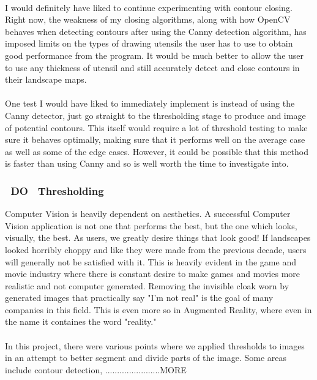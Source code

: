\documentclass[11pt]{article}
\begin{document}
\\
I would definitely have liked to continue experimenting with contour closing.
Right now, the weakness of my closing algorithms, along with how OpenCV
behaves when detecting contours after using the Canny detection algorithm, 
has imposed limits on the types of drawing utensils the user has to use to
obtain good performance from the program. It would be much
better to allow the user to use any thickness of utensil and still 
accurately detect and close contours in their landscape maps.\\
\\
One test I would have liked to immediately implement is instead of using
the Canny detector, just go straight to the thresholding stage to produce
and image of potential contours. This itself would require a lot of
threshold testing to make sure it behaves optimally, making sure that
it performs well on the average case as well as some of the edge cases.
However, it could be possible that this method is faster than using Canny
and so is well worth the time to investigate into. 

\subsubsection{~DO~ Thresholding}
Computer Vision is heavily dependent on aesthetics. A successful Computer
Vision application is not one that performs the best, but the one which looks,
visually, the best. As users, we greatly desire things that look good! If
landscapes looked horribly choppy and like they were made from the previous 
decade, users will generally not be satisfied with it. This is heavily evident
in the game and movie industry where there is constant desire to make games
and movies more realistic and not computer generated. Removing the invisible 
cloak worn by generated images that practically say "I'm not real" is the
goal of many companies in this field. This is even more so in  Augmented Reality,
where even in the name it containes the word "reality." \\
\\
In this project, there were various points where we applied thresholds to images
in an attempt to better segment and divide parts of the image. Some areas include
contour detection, 
.......................MORE
\end{document}
